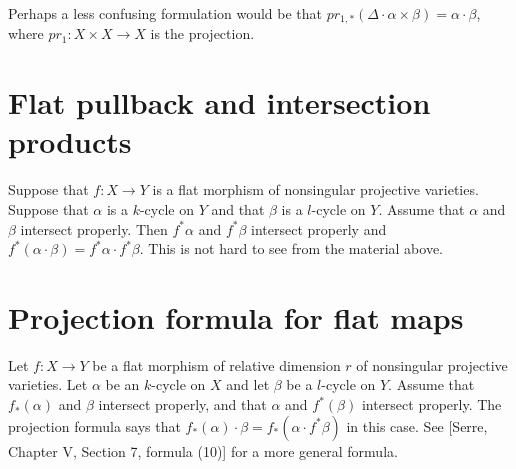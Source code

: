 \medskip\noindent
Perhaps a less confusing formulation would be that
$pr_{1,*}( \Delta \cdot \alpha\times\beta ) = \alpha\cdot\beta$,
where $pr_1 : X\times X \to X$ is the projection.




\section{Flat pullback and intersection products}
\label{section-flat-pullback-intersections}

\noindent
Suppose that $f : X \to Y$ is a flat morphism of nonsingular
projective varieties. Suppose that $\alpha$ is a $k$-cycle
on $Y$ and that $\beta$ is a $l$-cycle on $Y$. Assume that
$\alpha$ and $\beta$ intersect properly. Then $f^*\alpha$
and $f^*\beta$ intersect properly and $f^*( \alpha \cdot \beta )
= f^*\alpha \cdot f^*\beta$. This is not hard to see from
the material above.




\section{Projection formula for flat maps}
\label{section-projection-formula-flat}

\noindent
Let $f : X \to Y$ be a flat morphism
of relative dimension $r$ of nonsingular projective varieties.
Let $\alpha$ be an $k$-cycle on $X$ and let $\beta$ be a $l$-cycle
on $Y$. Assume that $f_*(\alpha)$ and $\beta$ intersect properly,
and that $\alpha$ and $f^*(\beta)$ intersect properly. The projection
formula says that $f_*(\alpha) \cdot \beta =
f_*( \alpha \cdot f^*\beta)$ in this case.
See [Serre, Chapter V, Section 7, formula (10)] for a more general formula. 

